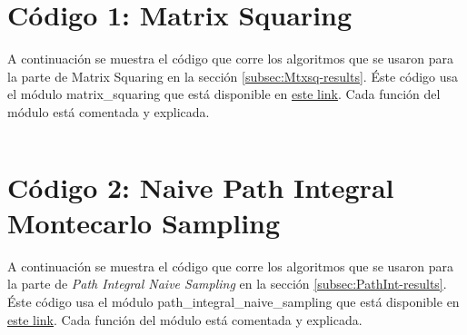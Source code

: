 \documentclass[%
 reprint,
 amsmath,amssymb,
 aps,
 pra,
]{revtex4-2}
\begin{document}
\begin{widetext}

\section{Código 1: Matrix Squaring\label{appx:codigo_matrix_squaring}}

A continuación se muestra el código que corre los algoritmos que se usaron para la parte de Matrix Squaring en la sección \ref{subsec:Mtxsq-results}. Éste código usa el módulo matrix\_squaring que está disponible en \href{https://github.com/jearistiz/Statistical-Physics-Projects/blob/master/2/matrix_squaring.py}{este link}. Cada función del módulo está comentada y explicada.

\inputminted[linenos,breaklines]{python}{code_1.py}

\section{Código 2: Naive Path Integral Montecarlo Sampling\label{appx:codigo-path-int}}

A continuación se muestra el código que corre los algoritmos que se usaron para la parte de \textit{Path Integral Naive Sampling} en la sección \ref{subsec:PathInt-results}. Éste código usa el módulo path\_integral\_naive\_sampling que está disponible en \href{https://github.com/jearistiz/Statistical-Physics-Projects/blob/master/2/path_integral_naive_sampling.py}{este link}. Cada función del módulo está comentada y explicada.

\inputminted[linenos,breaklines]{python}{code_2.py}

\end{widetext}
\end{document}
